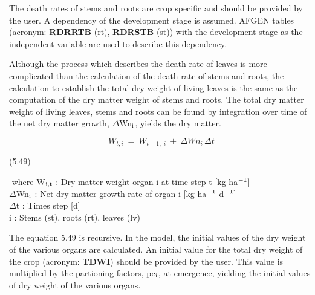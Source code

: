  
The death rates of stems and roots are crop specific and should be provided by the user.
A dependency of the development stage is assumed. AFGEN tables (acronym: {\bf RDR\-RTB}
(rt), {\bf RDRSTB} (st)) with the development stage as the independent variable are used to
describe this dependency.



Although the process which describes the death rate of leaves is more complicated than
the calculation of the death rate of stems and roots, the calculation to establish the total
dry weight of living leaves is the same as the computation of the dry matter weight of
stems and roots. The total dry matter weight of living leaves, stems and roots can be
found by integration over time of the net dry matter growth, $\Delta$Wn$_{{\rm i}}$, yields the dry matter.

\begin{displaymath}
W _{t,i} ~=~W _{t-1\, ,\, i} ~+~\Delta Wn _{i} \,\Delta t
\end{displaymath}

 
\strut\hfill (5.49)
\nwln
\begin{tabbing}
\hspace{1.27cm}\=\hspace{1.27cm}\=\hspace{1.27cm}\=\hspace{1.27cm}\=%
\hspace{1.27cm}\=\hspace{1.27cm}\=\hspace{1.27cm}\=\hspace{1.27cm}\=%
\hspace{1.27cm}\=\hspace{1.27cm}\=\kill
where W$_{{\rm i,t}}$ : Dry matter weight organ i at time step t        [kg ha$^{{\rm -1}}$]\\
$\Delta$Wn$_{{\rm i}}$ : Net dry matter growth rate of organ i        [kg ha$^{{\rm -1}}$ d$^{{\rm -1}}$]\\
$\Delta$t : Times step        [d]\\
i : Stems (st), roots (rt), leaves (lv)
\end{tabbing}

 The equation 5.49 is recursive. In the model, the initial values of the dry weight of the
various organs are calculated. An initial value for the total dry weight of the crop
(acronym: {\bf TDWI}) should be provided by the user. This value is multiplied by the
partioning factors, pc$_{{\rm i}}$, at emergence, yielding the initial values of dry weight of the
various organs.



